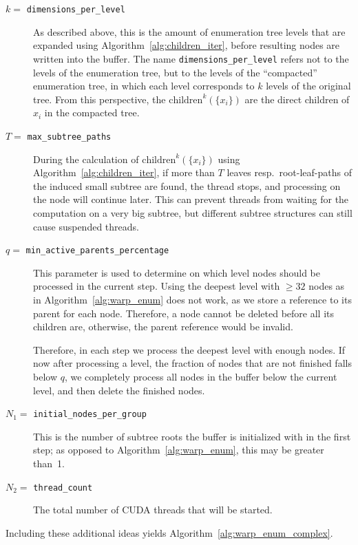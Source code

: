 \documentclass{scrartcl}
\begin{document}
    \begin{description}
        \item[$k =$ \texttt{dimensions\_per\_level}]
            As described above, this is the amount of enumeration tree levels that are expanded using Algorithm~\ref{alg:children_iter}, before resulting nodes are written into the buffer. The name \texttt{dimensions\_per\_level} refers not to the levels of the enumeration tree, but to the levels of the ``compacted'' enumeration tree, in which each level corresponds to $k$ levels of the original tree. From this perspective, the $\mathrm{children}^k(\{x_i\})$ are the direct children of $x_i$ in the compacted tree.
        \item[$T =$ \texttt{max\_subtree\_paths}] 
            During the calculation of $\mathrm{children}^k(\{x_i\})$ using Algorithm~\ref{alg:children_iter}, if more than $T$ leaves resp.\ root-leaf-paths of the induced small subtree are found, the thread stops, and processing on the node will continue later. This can prevent threads from waiting for the computation on a very big subtree, but different subtree structures can still cause suspended threads. 
        \item[$q =$ \texttt{min\_active\_parents\_percentage}]
            This parameter is used to determine on which level nodes should be processed in the current step. Using the deepest level with $\geq 32$ nodes as in Algorithm~\ref{alg:warp_enum} does not work, as we store a reference to its parent for each node. Therefore, a node cannot be deleted before all its children are, otherwise, the parent reference would be invalid. 
            
            Therefore, in each step we process the deepest level with enough nodes.
            If now after processing a level, the fraction of nodes that are not finished falls below $q$, we completely process all nodes in the buffer below the current level, and then delete the finished nodes.
        \item[$N_1 =$ \texttt{initial\_nodes\_per\_group}]
            This is the number of subtree roots the buffer is initialized with in the first step; as opposed to Algorithm~\ref{alg:warp_enum}, this may be greater than~1.
        \item[$N_2 =$ \texttt{thread\_count}]
            The total number of CUDA threads that will be started. 
    \end{description}

    Including these additional ideas yields Algorithm~\ref{alg:warp_enum_complex}.
\end{document}

